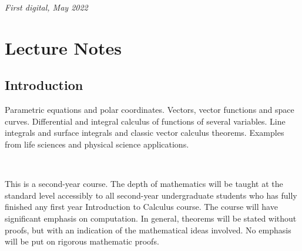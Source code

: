 \documentclass[11pt,fleqn]{book} %
\begin{document}
\noindent \textit{First digital, May 2022} %




\pagestyle{empty} %

\tableofcontents %

\cleardoublepage %

\pagestyle{fancy} %



\part{Lecture Notes}


\chapter*{Introduction}

Parametric equations and polar coordinates. Vectors, vector functions and space curves. Differential and integral calculus of functions of several variables. Line integrals and surface integrals and classic vector calculus theorems. Examples from life sciences and physical science applications.

{~~~}

This is a second-year  course. The depth of mathematics will be taught at the standard level accessibly to all second-year undergraduate students who has fully finished any first year Introduction to Calculus course. The course will have significant emphasis on computation. In general, theorems will be stated without proofs, but with an indication of the mathematical ideas involved. No emphasis will be put on rigorous mathematic proofs.
\end{document}
